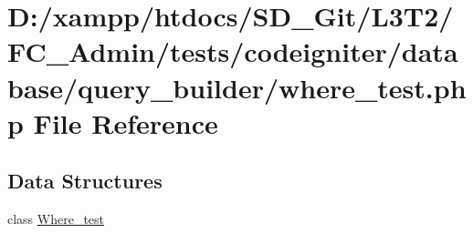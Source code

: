 \hypertarget{_admin_2tests_2codeigniter_2database_2query__builder_2where__test_8php}{}\section{D\+:/xampp/htdocs/\+S\+D\+\_\+\+Git/\+L3\+T2/\+F\+C\+\_\+\+Admin/tests/codeigniter/database/query\+\_\+builder/where\+\_\+test.php File Reference}
\label{_admin_2tests_2codeigniter_2database_2query__builder_2where__test_8php}
\subsection*{Data Structures}
\begin{DoxyCompactItemize}
\item 
class \hyperlink{class_where__test}{Where\+\_\+test}
\end{DoxyCompactItemize}

